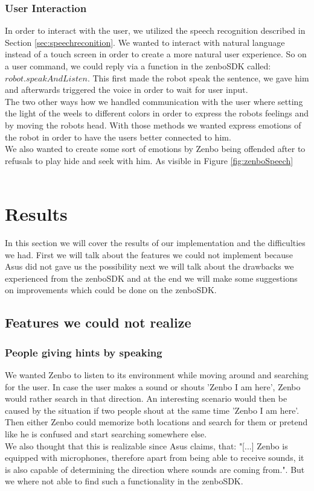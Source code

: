 \documentclass[conference]{IEEEtran}
\begin{document}
\subsubsection{User Interaction}
In order to interact with the user, we utilized the speech recognition described in Section \ref{sec:speechreconition}. We wanted to 
interact with natural language instead of a touch screen in order to create a more natural user experience.
So on a user command, we could reply via a function in the zenboSDK called: $robot.speakAndListen$. This first made the robot speak the sentence, we 
gave him and afterwards triggered the voice in order to wait for user input.\\
The two other ways how we handled communication with the user where setting the light of the weels to different colors in order to express the robots feelings and 
by moving the robots head. With those methods we wanted express emotions of the robot in order to have the users better connected to him.\\
We also wanted to create some sort of emotions by Zenbo being offended after to refusals to play hide and seek with him. As visible in Figure \ref{fig:zenboSpeech}
\\\\
\section{Results}
In this section we will cover the results of our implementation and the difficulties we had.
First we will talk about the features we could not implement because Asus did not gave us the possibility
next we will talk about the drawbacks we experienced from the zenboSDK and at the end we will make some suggestions on improvements which could be done on the zenboSDK.
\subsection{Features we could not realize} \label{sec:drawbacks}
\subsubsection{People giving hints by speaking}
We wanted Zenbo to listen to its environment while moving around and searching for the user. In case the user makes a sound or shouts 'Zenbo I am here', 
Zenbo would rather search in that direction. An interesting scenario would then be caused by the situation if two people shout at the same time 'Zenbo I am here'.
Then either Zenbo could memorize both locations and search for them or pretend like he is confused and start searching somewhere else.\\
We also thought that this is realizable since Asus claims, that: 
"[...] Zenbo is equipped with microphones, therefore apart from being able to receive sounds, it is also capable of determining the direction where sounds are coming from.". \cite{b5}
But we where not able to find such a functionality in the zenboSDK.
\end{document}
